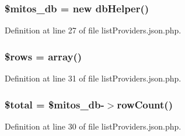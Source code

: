 \hypertarget{list_providers_8json_8php_ab5d961f93efe4e2e8d8374f01dd6c65a}{
\subsubsection[{\$mitos\-\_\-db}]{\setlength{\rightskip}{0pt plus 5cm}\$mitos\-\_\-db = new {\bf db\-Helper}()}}\label{list_providers_8json_8php_ab5d961f93efe4e2e8d8374f01dd6c65a}


\-Definition at line 27 of file list\-Providers.\-json.\-php.

\hypertarget{list_providers_8json_8php_ace2ec39e7df3899fa8df9640ec274b03}{
\subsubsection[{\$rows}]{\setlength{\rightskip}{0pt plus 5cm}\$rows = array()}}\label{list_providers_8json_8php_ace2ec39e7df3899fa8df9640ec274b03}


\-Definition at line 31 of file list\-Providers.\-json.\-php.

\hypertarget{list_providers_8json_8php_a241b818f48030b628685b2e5119c5624}{
\subsubsection[{\$total}]{\setlength{\rightskip}{0pt plus 5cm}\$total = \$mitos\-\_\-db-\/$>$row\-Count()}}\label{list_providers_8json_8php_a241b818f48030b628685b2e5119c5624}


\-Definition at line 30 of file list\-Providers.\-json.\-php.

